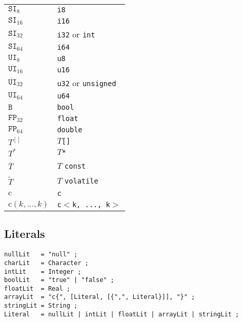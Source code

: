 \documentclass{article}
\newcommand{\R}[1]{\mathtt{#1}}
\begin{document}
\begin{tabular}{|l|l|}
\hline
$\R{SI}_8$ & \texttt{i8} \\
$\R{SI}_{16}$ & \texttt{i16} \\
$\R{SI}_{32}$ & \texttt{i32} or \texttt{int} \\
$\R{SI}_{64}$ & \texttt{i64} \\
$\R{UI}_8$ & \texttt{u8} \\
$\R{UI}_{16}$ & \texttt{u16} \\
$\R{UI}_{32}$ & \texttt{u32} or \texttt{unsigned} \\
$\R{UI}_{64}$ & \texttt{u64} \\
$\R{B}$ & \texttt{bool} \\
$\R{FP}_{32}$ & \texttt{float} \\
$\R{FP}_{64}$ & \texttt{double} \\
$T^{[]}$ & $T$\texttt{[]} \\
$T^*$ & $T$\texttt{*} \\
$\overline{T}$ & $T$ \texttt{const} \\
$\widetilde{T}$ & $T$ \texttt{volatile} \\
$\mathrm{c}$ & \texttt{c} \\
$\mathrm{c}(k,\ldots,k)$ & \texttt{c$<$k,~...,~k$>$} \\
\hline
\end{tabular}

\subsection{Literals}
\label{sub:types:literals}
\begin{verbatim}
nullLit   = "null" ;
charLit   = Character ;
intLit    = Integer ;
boolLit   = "true" | "false" ;
floatLit  = Real ;
arrayLit  = "c{", [Literal, [{",", Literal}]], "}" ;
stringLit = String ;
Literal   = nullLit | intLit | floatLit | arrayLit | stringLit ;
\end{verbatim}
\end{document}
